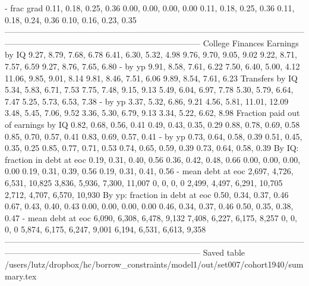                            - frac grad       0.11, 0.18, 0.25, 0.36       0.00, 0.00, 0.00, 0.00   0.11, 0.18, 0.25, 0.36       0.11, 0.18, 0.24, 0.36       0.10, 0.16, 0.23, 0.35
-----------------------------------------------------------------------------------------------------------------------------------------------------------------------------------
                      College Finances                                                                                                                                             
                        Earnings by IQ       9.27, 8.79, 7.68, 6.78       6.41, 6.30, 5.32, 4.98   9.76, 9.70, 9.05, 9.02       9.22, 8.71, 7.57, 6.59       9.27, 8.76, 7.65, 6.80
                               - by yp       9.91, 8.58, 7.61, 6.22       7.50, 6.40, 5.00, 4.12  11.06, 9.85, 9.01, 8.14       9.81, 8.46, 7.51, 6.06       9.89, 8.54, 7.61, 6.23
                       Transfers by IQ       5.34, 5.83, 6.71, 7.53       7.75, 7.48, 9.15, 9.13   5.49, 6.04, 6.97, 7.78       5.30, 5.79, 6.64, 7.47       5.25, 5.73, 6.53, 7.38
                               - by yp       3.37, 5.32, 6.86, 9.21     4.56, 5.81, 11.01, 12.09   3.48, 5.45, 7.06, 9.52       3.36, 5.30, 6.79, 9.13       3.34, 5.22, 6.62, 8.98
   Fraction paid out of earnings by IQ       0.82, 0.68, 0.56, 0.41       0.49, 0.43, 0.35, 0.29   0.88, 0.78, 0.69, 0.58       0.85, 0.70, 0.57, 0.41       0.83, 0.69, 0.57, 0.41
                               - by yp       0.73, 0.64, 0.58, 0.39       0.51, 0.45, 0.35, 0.25   0.85, 0.77, 0.71, 0.53       0.74, 0.65, 0.59, 0.39       0.73, 0.64, 0.58, 0.39
        By IQ: fraction in debt at eoc       0.19, 0.31, 0.40, 0.56       0.36, 0.42, 0.48, 0.66   0.00, 0.00, 0.00, 0.00       0.19, 0.31, 0.39, 0.56       0.19, 0.31, 0.41, 0.56
                    - mean debt at eoc  2,697, 4,726, 6,531, 10,825  3,836, 5,936, 7,300, 11,007               0, 0, 0, 0  2,499, 4,497, 6,291, 10,705  2,712, 4,707, 6,570, 10,930
        By yp: fraction in debt at eoc       0.50, 0.34, 0.37, 0.46       0.67, 0.43, 0.40, 0.43   0.00, 0.00, 0.00, 0.00       0.46, 0.34, 0.37, 0.46       0.50, 0.35, 0.38, 0.47
                    - mean debt at eoc   6,090, 6,308, 6,478, 9,132   7,408, 6,227, 6,175, 8,257               0, 0, 0, 0   5,874, 6,175, 6,247, 9,001   6,194, 6,531, 6,613, 9,358
-----------------------------------------------------------------------------------------------------------------------------------------------------------------------------------
Saved table  /users/lutz/dropbox/hc/borrow_constraints/model1/out/set007/cohort1940/summary.tex 
